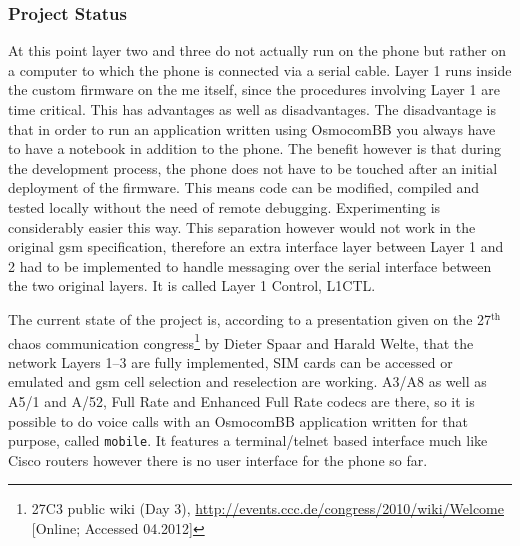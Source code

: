\subsubsection{Project Status}
At this point layer two and three do not actually run on the phone but rather on a computer to which the phone is connected via a serial cable.
Layer 1 runs inside the custom firmware on the \gls{me} itself, since the procedures involving Layer 1 are time critical.
This has advantages as well as disadvantages.
The disadvantage is that in order to run an application written using OsmocomBB you always have to have a notebook in addition to the phone.
The benefit however is that during the development process, the phone does not have to be touched after an initial deployment of the firmware.
This means code can be modified, compiled and tested locally without the need of remote debugging.
Experimenting is considerably easier this way.
This separation however would not work in the original \gls{gsm} specification, therefore an extra interface layer between Layer 1 and 2 had to be implemented to handle messaging over the serial interface between the two original layers.
It is called Layer 1 Control, L1CTL.

The current state of the project is, according to a presentation given on the 27$^\text{th}$ chaos communication congress\footnote{27C3 public wiki (Day 3), \url{http://events.ccc.de/congress/2010/wiki/Welcome} [Online; Accessed 04.2012]} by Dieter Spaar and Harald Welte, that the network Layers 1--3 are fully implemented, SIM cards can be accessed or emulated and \gls{gsm} cell selection and reselection are working.
A3/A8 as well as A5/1 and A/52, Full Rate and Enhanced Full Rate codecs are there, so it is possible to do voice calls with an OsmocomBB application written for that purpose, called \texttt{mobile}.
It features a terminal/telnet based interface much like Cisco routers however there is no user interface for the phone so far.


